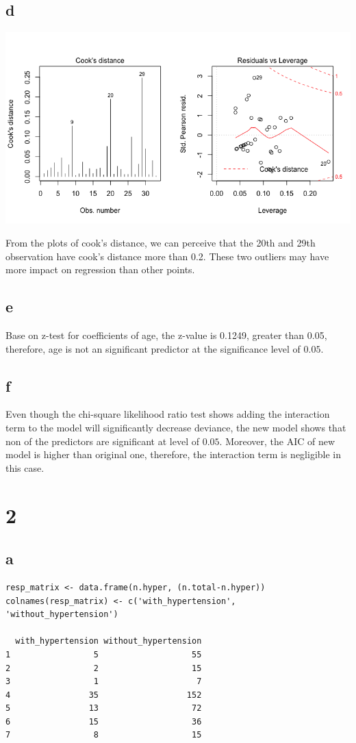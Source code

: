 \documentclass[11pt,letterpaper]{article}
\begin{document}
\subsection*{d}
\includegraphics[scale=0.6]{1-d-1.png}

\noindent From the plots of cook's distance, we can perceive that the 20th and 29th observation have cook's distance more than 0.2. These two outliers may have more impact on regression than other points. 

\subsection*{e}
\noindent Base on z-test for coefficients of age, the z-value is 0.1249, greater than 0.05, therefore, age is not an significant predictor at the significance level of $0.05$.

\subsection*{f}
\noindent Even though the chi-square likelihood ratio test shows adding the interaction term to the model will significantly decrease deviance, the new model shows that non of the predictors are significant at level of $0.05$. Moreover, the AIC of new model is higher than original one, therefore, the interaction term is negligible in this case. 

\section*{2}
\subsection*{a}
\begin{verbatim}
resp_matrix <- data.frame(n.hyper, (n.total-n.hyper))
colnames(resp_matrix) <- c('with_hypertension', 'without_hypertension')

  with_hypertension without_hypertension
1                 5                   55
2                 2                   15
3                 1                    7
4                35                  152
5                13                   72
6                15                   36
7                 8                   15
\end{verbatim}
\end{document}
